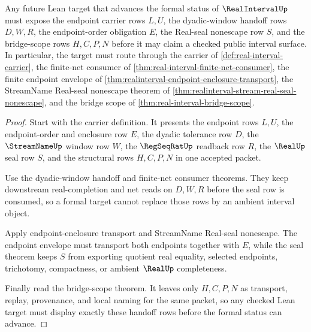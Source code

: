\begin{theorem}
\label{thm:realinterval-formal-target-handoff}
Any future Lean target that advances the formal status of $\RealIntervalUp$ must expose the endpoint carrier rows $L,U$, the dyadic-window handoff rows $D,W,R$, the endpoint-order obligation $E$, the Real-seal nonescape row $S$, and the bridge-scope rows $H,C,P,N$ before it may claim a checked public interval surface. In particular, the target must route through the carrier of \autoref{def:real-interval-carrier}, the finite-net consumer of \autoref{thm:real-interval-finite-net-consumer}, the finite endpoint envelope of \autoref{thm:realinterval-endpoint-enclosure-transport}, the StreamName Real-seal nonescape theorem of \autoref{thm:realinterval-stream-real-seal-nonescape}, and the bridge scope of \autoref{thm:real-interval-bridge-scope}.
\end{theorem}
\begin{proof}
Start with the carrier definition. It presents the endpoint rows $L,U$, the endpoint-order and enclosure row $E$, the dyadic tolerance row $D$, the $\StreamNameUp$ window row $W$, the $\RegSeqRatUp$ readback row $R$, the $\RealUp$ seal row $S$, and the structural rows $H,C,P,N$ in one accepted packet.

Use the dyadic-window handoff and finite-net consumer theorems. They keep downstream real-completion and net reads on $D,W,R$ before the seal row is consumed, so a formal target cannot replace those rows by an ambient interval object.

Apply endpoint-enclosure transport and StreamName Real-seal nonescape. The endpoint envelope must transport both endpoints together with $E$, while the seal theorem keeps $S$ from exporting quotient real equality, selected endpoints, trichotomy, compactness, or ambient $\RealUp$ completeness.

Finally read the bridge-scope theorem. It leaves only $H,C,P,N$ as transport, replay, provenance, and local naming for the same packet, so any checked Lean target must display exactly these handoff rows before the formal status can advance.
\end{proof}

